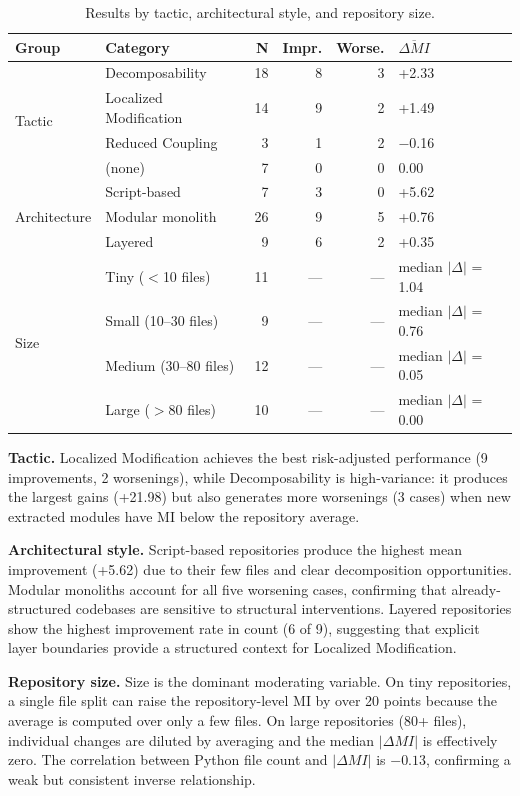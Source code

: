 \begin{table}[H]
\centering
\small
\caption{Results by tactic, architectural style, and repository size.}
\label{tab:exp5_combined}
\begin{tabular}{llrrrl}
\toprule
\textbf{Group} & \textbf{Category} & \textbf{N} & \textbf{Impr.} & \textbf{Worse.} & $\overline{\Delta MI}$ \\
\midrule
\multirow{4}{*}{Tactic}
  & Decomposability        & 18 & 8 & 3 & +2.33 \\
  & Localized Modification & 14 & 9 & 2 & +1.49 \\
  & Reduced Coupling       & 3  & 1 & 2 & $-$0.16 \\
  & (none)                 & 7  & 0 & 0 & 0.00 \\
\midrule
\multirow{3}{*}{Architecture}
  & Script-based     & 7  & 3 & 0 & +5.62 \\
  & Modular monolith & 26 & 9 & 5 & +0.76 \\
  & Layered          & 9  & 6 & 2 & +0.35 \\
\midrule
\multirow{4}{*}{Size}
  & Tiny ($<$10 files)    & 11 & — & — & median $|\Delta|$ = 1.04 \\
  & Small (10--30 files)  & 9  & — & — & median $|\Delta|$ = 0.76 \\
  & Medium (30--80 files) & 12 & — & — & median $|\Delta|$ = 0.05 \\
  & Large ($>$80 files)   & 10 & — & — & median $|\Delta|$ = 0.00 \\
\bottomrule
\end{tabular}
\end{table}

\textbf{Tactic.} Localized Modification achieves the best risk-adjusted performance (9 improvements, 2 worsenings), while Decomposability is high-variance: it produces the largest gains (+21.98) but also generates more worsenings (3 cases) when new extracted modules have MI below the repository average.

\textbf{Architectural style.} Script-based repositories produce the highest mean improvement (+5.62) due to their few files and clear decomposition opportunities. Modular monoliths account for all five worsening cases, confirming that already-structured codebases are sensitive to structural interventions. Layered repositories show the highest improvement rate in count (6 of 9), suggesting that explicit layer boundaries provide a structured context for Localized Modification.

\textbf{Repository size.} Size is the dominant moderating variable. On tiny repositories, a single file split can raise the repository-level MI by over 20 points because the average is computed over only a few files. On large repositories (80+ files), individual changes are diluted by averaging and the median $|\Delta MI|$ is effectively zero. The correlation between Python file count and $|\Delta MI|$ is $-0.13$, confirming a weak but consistent inverse relationship.


